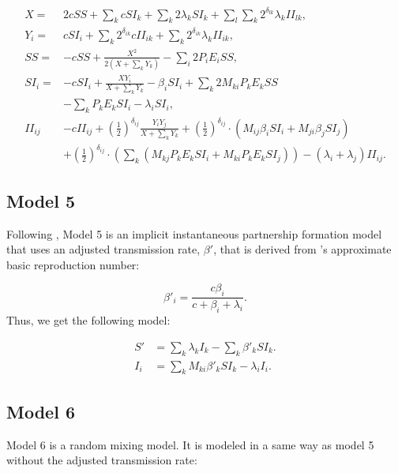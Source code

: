 \documentclass[10pt,letterpaper]{article}
\newcommand{\khalf}{\left(\frac{1}{2}\right)^{\delta_{ij}}}  %
\begin{document}
\begin{equation}
\begin{aligned}
X =& 2 c SS + \sum_k c SI_k + \sum_k 2 \lambda_k SI_k + \sum_l \sum_k 2^{\delta_{lk}}  \lambda_k II_{lk},\\
Y_i =& c SI_i + \sum_k 2^{\delta_{ik}}  c II_{ik} + \sum_k  2^{\delta_{ik}}  \lambda_k II_{ik}, \\
SS  =& - c SS + \frac{X^2}{2 (X + \sum_k Y_k)}  - \sum_i 2 P_i E_i SS,\\
SI_i =& - c SI_i + \frac{X Y_i}{X + \sum_k Y_k} - \beta_i SI_i + \sum_k 2 M_{ki} P_k E_k SS\\
&- \sum_k P_k E_k SI_i - \lambda_i SI_i,\\
II_{ij}& - c II_{ij} +\khalf \frac{Y_i Y_j}{X + \sum_k Y_k} + \khalf \cdot (M_{ij} \beta_i SI_i + M_{ji} \beta_j SI_j)\\
&+ \khalf \cdot (\sum_k (M_{kj} P_k E_k SI_i + M_{ki} P_k E_k SI_j)) -(\lambda_i + \lambda_j) II_{ij}.
\end{aligned}
\end{equation}

\subsection*{Model 5}

Following \cite{shirreff_transmission_2011}, Model 5 is an implicit instantaneous partnership formation model that uses an adjusted transmission rate, $\beta'$, that is derived from \cite{hollingsworth_hiv1_2008}'s approximate basic reproduction number:

\begin{equation}
\beta'_i = \frac{c \beta_i}{c + \beta_i + \lambda_i}.
\end{equation}
Thus, we get the following model:

\begin{equation}
\begin{aligned}
S' & = \sum_k \lambda_k I_k - \sum_k \beta'_k S I_k.\\
I_i & = \sum_k M_{ki} \beta'_k S I_k - \lambda_i I_i.
\end{aligned}
\end{equation}

\subsection*{Model 6}

Model 6 is a random mixing model. It is modeled in a same way as model 5 without the adjusted transmission rate:
\end{document}

